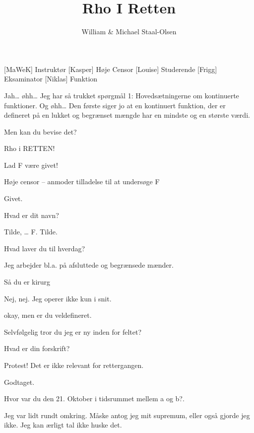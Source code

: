 \documentclass[a4paper,11pt]{article}
\title{Rho I Retten}
\author{William \& Michael Staal-Olsen}
\begin{document}
\maketitle

\begin{roles}
[MaWeK] Instruktør
[Kasper] Høje Censor
[Louise] Studerende
[Frigg] Eksaminator
[Niklas] Funktion
\end{roles}

\begin{sketch}

 Jah… øhh… Jeg har så trukket spørgmål 1: Hovedsætningerne om kontinuerte funktioner. Og øhh… Den første siger jo at en kontinuert funktion, der er defineret på en lukket og begrænset mængde har en mindste og en største værdi.

  Men kan du bevise det?


 Rho i RETTEN!

 Lad F være givet!


 Høje censor – anmoder tilladelse til at undersøge F

 Givet.

 Hvad er dit navn?

 Tilde, … F. Tilde.

  Hvad laver du til hverdag?

 Jeg arbejder bl.a. på afsluttede og begrænsede mænder.

 Så du er kirurg

 Nej, nej. Jeg operer ikke kun i snit.

 okay, men er du veldefineret.

 Selvfølgelig tror du jeg er ny inden for feltet? %

 Hvad er din forskrift?

 Protest! Det er ikke relevant for rettergangen.

 Godtaget.

 Hvor var du den 21. Oktober i tidsrummet mellem a og b?.


 Jeg var lidt rundt omkring. Måske antog jeg mit supremum, eller også gjorde jeg ikke. Jeg kan ærligt tal ikke huske det.


\end{sketch}
\end{document}
